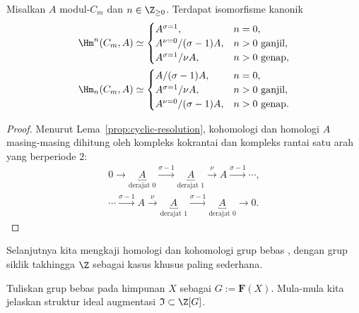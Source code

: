 \begin{proposition}\label{prop:group-cohomology-cyclic}
	Misalkan $A$ modul-$C_m$ dan $n\in\Z_{\geq0}$. Terdapat isomorfisme
	kanonik
	\begin{align*}
		\Hm^n(C_m,A)&\simeq
		\begin{cases}
			A^{\sigma=1},&n=0,\\
			A^{\nu=0}/(\sigma-1)A,&n>0\ \text{ganjil},\\
			A^{\sigma=1}/\nu A,&n>0\ \text{genap},
		\end{cases}\\
		\Hm_n(C_m,A)&\simeq
		\begin{cases}
			A/(\sigma-1)A,&n=0,\\
			A^{\sigma=1}/\nu A,&n>0\ \text{ganjil},\\
			A^{\nu=0}/(\sigma-1)A,&n>0\ \text{genap}.
		\end{cases}
	\end{align*}
\end{proposition}
\begin{proof}
	Menurut Lema~\ref{prop:cyclic-resolution}, kohomologi dan homologi $A$
	masing-masing dihitung oleh kompleks kokrantai dan kompleks rantai satu arah yang
	berperiode $2$:
	\begin{gather*}
		0\to\underbracket{A}_{\text{derajat }0}
		\xrightarrow{\sigma-1}\underbracket{A}_{\text{derajat }1}
		\xrightarrow{\nu}A\xrightarrow{\sigma-1}\cdots,\\
		\cdots\xrightarrow{\sigma-1}A\xrightarrow{\nu}
		\underbracket{A}_{\text{derajat }1}\xrightarrow{\sigma-1}
		\underbracket{A}_{\text{derajat }0}\to0.
	\end{gather*}
\end{proof}

Selanjutnya kita mengkaji homologi dan kohomologi grup bebas
\cite[Definisi 4.8.2]{Li1}, dengan grup siklik takhingga $\Z$ sebagai kasus
khusus paling sederhana.

Tuliskan grup bebas pada himpunan $X$ sebagai $G:=\mathbf{F}(X)$. Mula-mula
kita jelaskan struktur ideal augmentasi $\mathfrak{I}\subset\Z[G]$.

